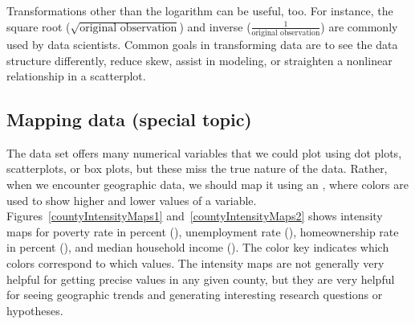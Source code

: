 Transformations other than the logarithm can be useful, too.
For instance, the square root
($\sqrt{\text{original observation}}$) and inverse
($\frac{1}{\text{original observation}}$) are commonly used
by data scientists.
Common goals in transforming data are to see the data
structure differently, reduce skew, assist in modeling,
or straighten a nonlinear relationship in a scatterplot.



\subsection{Mapping data (special topic)}


The  data set offers many numerical variables
that we could plot using dot plots, scatterplots,
or box plots, but these miss the true nature of the data.
Rather, when we encounter geographic data, we should map
it using an , where colors are used
to show higher and lower values of a variable.
Figures~\ref{countyIntensityMaps1}
and~\ref{countyIntensityMaps2} shows intensity maps for
poverty rate in percent (),
unemployment rate (),
homeownership rate in percent (),
and median household income
().
The color key indicates which colors correspond to which values.
The intensity maps are not generally very helpful
for getting precise values in any given county,
but they are very helpful for seeing geographic trends
and generating interesting research questions or hypotheses.

